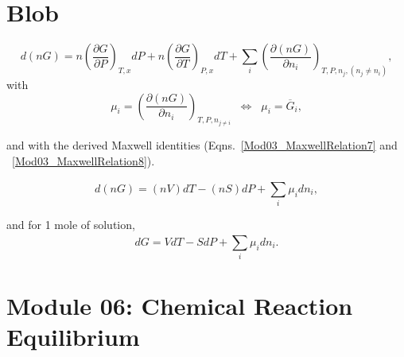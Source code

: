 \documentclass[12pts,a4paper,amsmath,amssymb,floatfix]{article}%
\newcommand{\frc}{\displaystyle\frac}
\newcommand{\Partial}[3][error]{\left(\frc{\partial #1}{\partial #2}\right)_{#3}}
\newcommand{\summation}[3][error]{\sum\limits_{#2}^{#3}#1}
\begin{document}
  \section{Blob}
  \begin{displaymath}
    d(nG) = n\Partial[G]{P}{T,x}dP + n\Partial[G]{T}{P,x}dT + \sum\limits_{i} \Partial[(nG)]{n_{i}}{T,P,n_{j},\left(n_{j}\ne n_{i}\right)},
  \end{displaymath}
  with
  \begin{displaymath}
      \mu_{i} = \Partial[(nG)]{n_{i}}{T,P,n_{j\ne i}} \;\;\Longleftrightarrow\;\; \mu_{i} = \overline{G}_{i},
  \end{displaymath}
  
  and with the derived Maxwell identities (Eqns.~\ref{Mod03_MaxwellRelation7} and ~\ref{Mod03_MaxwellRelation8}).
  \begin{shaded}
    \begin{equation}
      d(nG) = (nV) dT - (nS)dP + \summation[\mu_{i}dn_{i}]{i}{},\label{Mod05:PMP_Gibbs1}
    \end{equation}
  \end{shaded}
  and for 1 mole of solution,
    \begin{displaymath}
      dG = V dT - S dP + \summation[\mu_{i}dn_{i}]{i}{}.
    \end{displaymath}


\clearpage

\section{Module 06: Chemical Reaction Equilibrium}\label{Section:06}

\clearpage


\end{document}
